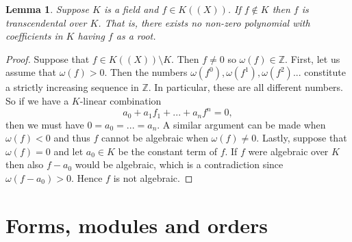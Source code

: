 \documentclass{article}
\newtheorem{lemma}{Lemma}[section]
\newcommand{\mbb}[1]{\mathbb{#1}}
\numberwithin{equation}{section}
\begin{document}
\begin{lemma}\label{lem: Unit power series is transcendental}
	Suppose $K$ is a field and $f \in K((X))$. If $f \notin K$ then $f$ is transcendental over $K$. That is, there exists no non-zero polynomial with coefficients in $K$ having $f$ as a root.
\end{lemma}
\begin{proof}
	Suppose that $f \in K((X)) \setminus K$. Then $f \neq 0$ so $\omega(f) \in \mbb Z$. First, let us assume that $\omega(f) > 0$. Then the numbers $\omega(f^0), \omega(f^1),\omega(f^2) ...$ constitute a strictly increasing sequence in $\mbb Z$. In particular, these are all different numbers. So if we have a $K$-linear combination
	$$a_0 + a_1 f_1 + ... + a_nf^n = 0,$$
	then we must have $0 = a_0 = ... = a_n$. A similar argument can be made when $\omega(f) < 0$ and thus $f$ cannot be algebraic when $\omega(f) \neq 0$. Lastly, suppose that $\omega(f) = 0$ and let $a_0 \in K$ be the constant term of $f$. If $f$ were algebraic over $K$ then also $f - a_0$ would be algebraic, which is a contradiction since $\omega(f - a_0) > 0$. Hence $f$ is not algebraic.
\end{proof}



\section{Forms, modules and orders}\label{sec: Forms and modules}
\end{document}
